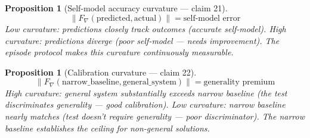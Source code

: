 \documentclass[11pt,a4paper]{article}
\newtheorem{proposition}[definition]{Proposition}
\begin{document}
\begin{proposition}[Self-model accuracy curvature --- claim 21]
\label{prop:self_curv}
\[
  \|F_\nabla(\text{predicted}, \text{actual})\| = \text{self-model error}
\]
Low curvature: predictions closely track outcomes (accurate self-model).
High curvature: predictions diverge (poor self-model --- needs
improvement). The episode protocol makes this curvature continuously
measurable.
\end{proposition}

\begin{proposition}[Calibration curvature --- claim 22]
\label{prop:calib_curv}
\[
  \|F_\nabla(\text{narrow\_baseline}, \text{general\_system})\| =
    \text{generality premium}
\]
High curvature: general system substantially exceeds narrow baseline
(the test discriminates generality --- good calibration). Low curvature:
narrow baseline nearly matches (test doesn't require generality --- poor
discriminator). The narrow baseline establishes the ceiling for
non-general solutions.
\end{proposition}
\end{document}

